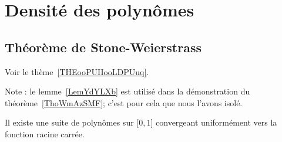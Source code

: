 
\section{Densité des polynômes}

\subsection{Théorème de Stone-Weierstrass}

Voir le thème~\ref{THEooPUIIooLDPUuq}.

Note : le lemme~\ref{LemYdYLXb} est utilisé dans la démonstration du théorème~\ref{ThoWmAzSMF}; c'est pour cela que nous l'avons isolé.

\begin{lemma}       \label{LemYdYLXb}
    Il existe une suite de polynômes sur \( \mathopen[ 0 , 1 \mathclose]\) convergeant uniformément vers la fonction racine carrée.
\end{lemma}

